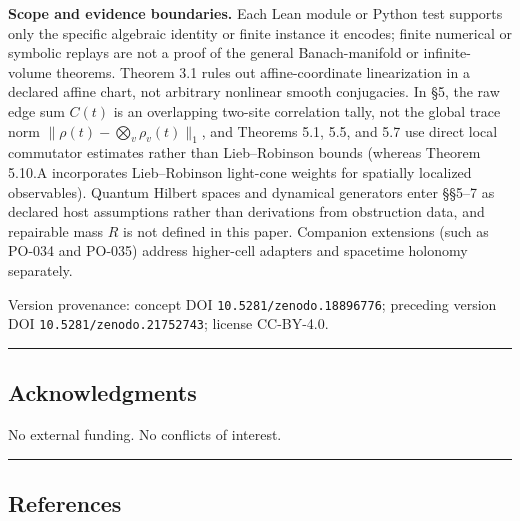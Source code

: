 \documentclass[
  11pt,
]{article}
\begin{document}
\textbf{Scope and evidence boundaries.} Each Lean module or Python test supports only the specific algebraic identity or finite instance it encodes; finite numerical or symbolic replays are not a proof of the general Banach-manifold or infinite-volume theorems. Theorem 3.1 rules out affine-coordinate linearization in a declared affine chart, not arbitrary nonlinear smooth conjugacies. In §5, the raw edge sum \(C(t)\) is an overlapping two-site correlation tally, not the global trace norm \(\lVert\rho(t)-\bigotimes_v\rho_v(t)\rVert_1\), and Theorems 5.1, 5.5, and 5.7 use direct local commutator estimates rather than Lieb--Robinson bounds (whereas Theorem 5.10.A incorporates Lieb--Robinson light-cone weights for spatially localized observables). Quantum Hilbert spaces and dynamical generators enter §§5--7 as declared host assumptions rather than derivations from obstruction data, and repairable mass \(R\) is not defined in this paper. Companion extensions (such as PO-034 and PO-035) address higher-cell adapters and spacetime holonomy separately.

Version provenance: concept DOI \texttt{10.5281/zenodo.18896776}; preceding version DOI \texttt{10.5281/zenodo.21752743}; license CC-BY-4.0.

\begin{center}\rule{0.5\linewidth}{0.5pt}\end{center}

\subsection{Acknowledgments}\label{acknowledgments}

No external funding. No conflicts of interest.

\begin{center}\rule{0.5\linewidth}{0.5pt}\end{center}

\subsection{References}\label{references}
\end{document}
